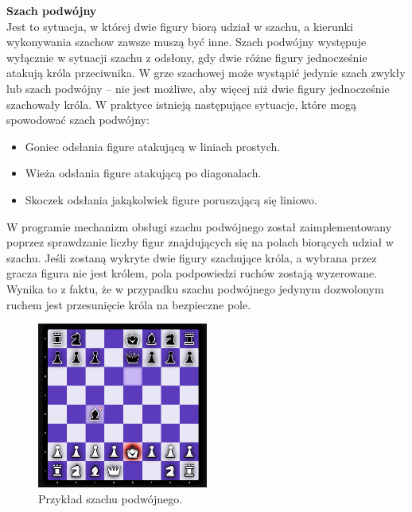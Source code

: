 \documentclass[twoside]{projektInzynierskiMS1}
\begin{document}
\newpage

\noindent \textbf{Szach podwójny}\\
Jest to sytuacja, w której dwie figury biorą udział w szachu, a kierunki wykonywania szachow zawsze muszą być inne. Szach podwójny występuje wyłącznie w sytuacji szachu z odsłony, gdy dwie różne figury jednocześnie atakują króla przeciwnika. W grze szachowej może wystąpić jedynie szach zwykły lub szach podwójny – nie jest możliwe, aby więcej niż dwie figury jednocześnie szachowały króla. W praktyce istnieją następujące sytuacje, które mogą spowodować szach podwójny:

\begin{itemize}
    \item Goniec odsłania figure atakującą w liniach prostych.
    \item Wieża odsłania figure atakującą po diagonalach.
    \item Skoczek odsłania jakąkolwiek figure poruszającą się liniowo.
\end{itemize}

\noindent
W programie mechanizm obsługi szachu podwójnego został zaimplementowany poprzez sprawdzanie liczby figur znajdujących się na polach biorących udział w szachu. Jeśli zostaną wykryte dwie figury szachujące króla, a wybrana przez gracza figura nie jest królem, pola podpowiedzi ruchów zostają wyzerowane. Wynika to z faktu, że w przypadku szachu podwójnego jedynym dozwolonym ruchem jest przesunięcie króla na bezpieczne pole.

\vspace{0.5cm}
\begin{figure}[h!]
    \centering
    \includegraphics[width=0.5\textwidth]{images/imp_double_check.png}
    \caption{Przykład szachu podwójnego.}
\end{figure}

\newpage
\end{document}
